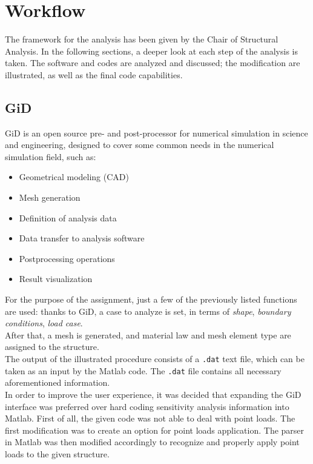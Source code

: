 
\section{Workflow}
The framework for the analysis has been given by the Chair of Structural Analysis. In the following sections, a deeper look at each step of the analysis is taken. The software and codes are analyzed and discussed; the modification are illustrated, as well as the final code capabilities. 
\subsection{GiD}
GiD is an open source pre- and post-processor for numerical simulation in science and engineering, designed to cover some common needs in the numerical simulation field, such as: 
\begin{itemize}
\item Geometrical modeling (CAD) 
\item Mesh generation
\item Definition of analysis data
\item Data transfer to analysis software
\item Postprocessing operations
\item Result visualization
\end{itemize}
For the purpose of the assignment, just a few of the previously listed functions are used: thanks to GiD, a case to analyze is set, in terms of \textit{shape}, \textit{boundary conditions}, \textit{load case}. \\[6pt]
After that, a mesh is generated, and material law and mesh element type are assigned to the structure. \\[6pt]
The output of the illustrated procedure consists of a \texttt{.dat} text file, which can be taken as an input by the Matlab code. The \texttt{.dat} file contains all necessary aforementioned information.\\[6pt]
In order to improve the user experience, it was decided that expanding the GiD interface was preferred over hard coding sensitivity analysis information into Matlab. First of all, the given code was not able to deal with point loads. The first modification was to create an option for point loads application. The parser in Matlab was then modified accordingly to recognize and properly apply point loads to the given structure.\\[6pt]
